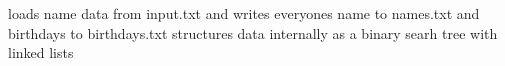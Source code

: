 loads name data from input.\+txt and writes everyone\textquotesingle{}s name to names.\+txt and birthdays to birthdays.\+txt structures data internally as a binary searh tree with linked lists 